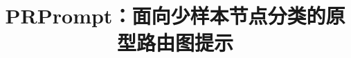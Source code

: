 \documentclass[11pt,fontset=none]{ctexart}
\title{PRPrompt：面向少样本节点分类的原型路由图提示}
\author{}
\date{}
\begin{document}
\maketitle

\clearpage
\begingroup
\small
\raggedright


\endgroup
\clearpage
\appendix
\small

\end{document}
